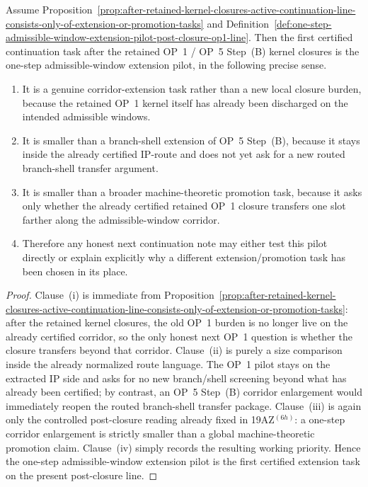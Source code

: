 \begin{proposition}
\label{prop:first-certified-extension-task-is-one-step-op1-admissible-window-pilot}
Assume Proposition~\ref{prop:after-retained-kernel-closures-active-continuation-line-consists-only-of-extension-or-promotion-tasks} and Definition~\ref{def:one-step-admissible-window-extension-pilot-post-closure-op1-line}. Then the first certified continuation task after the retained OP~1 / OP~5 Step~(B) kernel closures is the one-step admissible-window extension pilot, in the following precise sense.
\begin{enumerate}[leftmargin=2em,label=(\roman*)]
  \item It is a genuine corridor-extension task rather than a new local closure burden, because the retained OP~1 kernel itself has already been discharged on the intended admissible windows.
  \item It is smaller than a branch-shell extension of OP~5 Step~(B), because it stays inside the already certified IP-route and does not yet ask for a new routed branch-shell transfer argument.
  \item It is smaller than a broader machine-theoretic promotion task, because it asks only whether the already certified retained OP~1 closure transfers one slot farther along the admissible-window corridor.
  \item Therefore any honest next continuation note may either test this pilot directly or explain explicitly why a different extension/promotion task has been chosen in its place.
\end{enumerate}
\end{proposition}

\begin{proof}
Clause~(i) is immediate from Proposition~\ref{prop:after-retained-kernel-closures-active-continuation-line-consists-only-of-extension-or-promotion-tasks}: after the retained kernel closures, the old OP~1 burden is no longer live on the already certified corridor, so the only honest next OP~1 question is whether the closure transfers beyond that corridor. Clause~(ii) is purely a size comparison inside the already normalized route language. The OP~1 pilot stays on the extracted IP side and asks for no new branch/shell screening beyond what has already been certified; by contrast, an OP~5 Step~(B) corridor enlargement would immediately reopen the routed branch-shell transfer package. Clause~(iii) is again only the controlled post-closure reading already fixed in 19AZ$^{(6h)}$: a one-step corridor enlargement is strictly smaller than a global machine-theoretic promotion claim. Clause~(iv) simply records the resulting working priority. Hence the one-step admissible-window extension pilot is the first certified extension task on the present post-closure line.
\end{proof}


